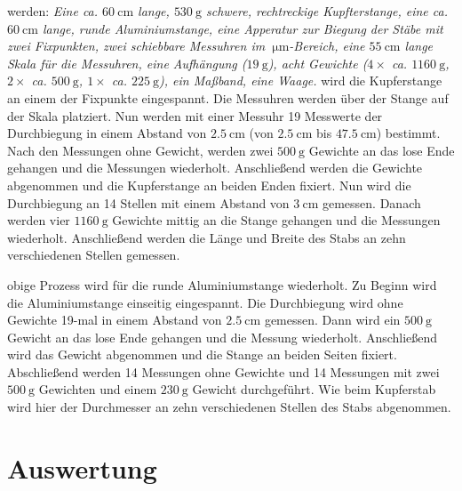 \justifying werden: \textit{ Eine ca. $\SI{60}{\centi\meter}$ lange, $\SI{530}{\gram}$ schwere, rechtreckige Kupfterstange, eine ca. $\SI{60}{\centi\meter}$ lange, runde
Aluminiumstange, eine Apperatur zur Biegung der Stäbe mit zwei Fixpunkten, zwei schiebbare Messuhren im $\SI{}{\micro\meter}$-Bereich, eine
$\SI{55}{\centi\meter}$ lange Skala für die Messuhren, eine Aufhängung ($\SI{19}{\gram}$), acht Gewichte ($4\times$ ca. $\SI{1160}{\gram}$, 
$2\times$ ca. $\SI{500}{\gram}$, $1\times$ ca. $\SI{225}{\gram}$), ein Maßband, eine Waage.
}
\justifying wird die Kupferstange an einem der Fixpunkte eingespannt. Die Messuhren werden über der Stange auf der Skala platziert. Nun werden mit 
einer Messuhr 19 Messwerte der Durchbiegung in einem Abstand von $\SI{2.5}{\centi\meter}$ (von $\SI{2.5}{\centi\meter}$ bis $\SI{47.5}{\centi\meter}$) 
bestimmt. Nach den Messungen ohne Gewicht, werden zwei $\SI{500}{\gram}$ Gewichte an das lose Ende gehangen und die Messungen wiederholt. Anschließend
werden die Gewichte abgenommen und die Kupferstange an beiden Enden fixiert. Nun wird die Durchbiegung an 14 Stellen mit einem Abstand von 
$\SI{3}{\centi\meter}$ gemessen. Danach werden vier $\SI{1160}{\gram}$ Gewichte mittig an die Stange gehangen und die Messungen wiederholt. 
Anschließend werden die Länge und Breite des Stabs an zehn verschiedenen Stellen gemessen.

\justifying obige Prozess wird für die runde Aluminiumstange wiederholt. Zu Beginn wird die Aluminiumstange einseitig eingespannt. Die Durchbiegung
wird ohne Gewichte 19-mal in einem Abstand von $\SI{2.5}{\centi\meter}$ gemessen. Dann wird ein $\SI{500}{\gram}$ Gewicht an das lose Ende 
gehangen und die Messung wiederholt. Anschließend wird das Gewicht abgenommen und die Stange an beiden Seiten fixiert. Abschließend werden 
14 Messungen ohne Gewichte und 14 Messungen mit zwei $\SI{500}{\gram}$ Gewichten und einem $\SI{230}{\gram}$ Gewicht durchgeführt. Wie beim Kupferstab
wird hier der Durchmesser an zehn verschiedenen Stellen des Stabs abgenommen.


\section{Auswertung}\justifying



